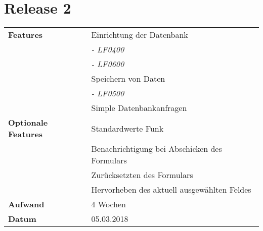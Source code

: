 
\section*{Release 2}
\label{sec:release_2}

\begin{tabular}{p{5cm} p{9cm}}
    \textbf{Features} & Einrichtung der Datenbank \\
    & \hspace{8pt} \textit{\footnotesize - LF0400} \\
    & \hspace{8pt} \textit{\footnotesize - LF0600} \\
    & Speichern von Daten \\
    & \hspace{8pt} \textit{\footnotesize - LF0500} \\
    & Simple Datenbankanfragen  \\
    \textbf{Optionale Features} & Standardwerte Funk \\
    & Benachrichtigung bei Abschicken des Formulars \\
    & Zurücksetzten des Formulars \\
    & Hervorheben des aktuell ausgewählten Feldes \\
    \hline
    \textbf{Aufwand} & 4 Wochen\\
    \hline
    \textbf{Datum} & 05.03.2018
\end{tabular}

